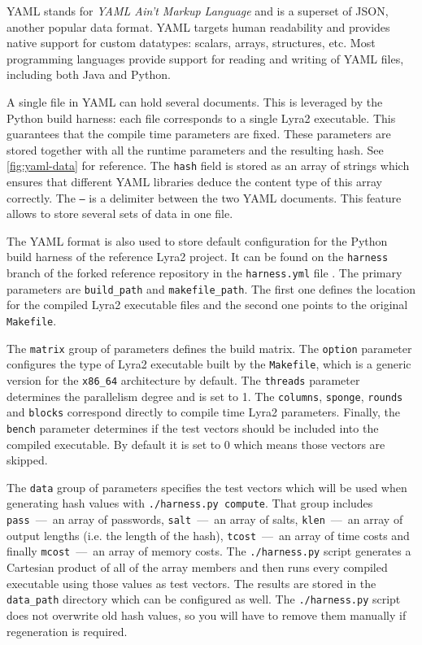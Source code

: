 YAML stands for \emph{YAML Ain't Markup Language} and is a superset of JSON, another popular data format. YAML targets human readability and provides native support for custom datatypes: scalars, arrays, structures, etc. Most programming languages provide support for reading and writing of YAML files, including both Java and Python.

A single file in YAML can hold several documents. This is leveraged by the Python build harness: each file corresponds to a single Lyra2 executable. This guarantees that the compile time parameters are fixed. These parameters are stored together with all the runtime parameters and the resulting hash. See \autoref{fig:yaml-data} for reference. The \texttt{hash} field is stored as an array of strings which ensures that different YAML libraries deduce the content type of this array correctly. The \texttt{---} is a delimiter between the two YAML documents. This feature allows to store several sets of data in one file.

The YAML format is also used to store default configuration for the Python build harness of the reference Lyra2 project. It can be found on the \texttt{harness} branch of the forked reference repository in the \texttt{harness.yml} file \cite{github:2017:lyra-copy}. The primary parameters are \texttt{build\_path} and \texttt{makefile\_path}. The first one defines the location for the compiled Lyra2 executable files and the second one points to the original \texttt{Makefile}.

The \texttt{matrix} group of parameters defines the build matrix. The \texttt{option} parameter configures the type of Lyra2 executable built by the \texttt{Makefile}, which is a generic version for the \texttt{x86\_64} architecture by default. The \texttt{threads} parameter determines the parallelism degree and is set to 1. The \texttt{columns}, \texttt{sponge}, \texttt{rounds} and \texttt{blocks} correspond directly to compile time Lyra2 parameters. Finally, the \texttt{bench} parameter determines if the test vectors should be included into the compiled executable. By default it is set to 0 which means those vectors are skipped.

The \texttt{data} group of parameters specifies the test vectors which will be used when generating hash values with \texttt{./harness.py compute}. That group includes \texttt{pass}~---~an array of passwords, \texttt{salt}~---~an array of salts, \texttt{klen}~---~an array of output lengths (i.e. the length of the hash), \texttt{tcost}~---~an array of time costs and finally \texttt{mcost}~---~an array of memory costs. The \texttt{./harness.py} script generates a Cartesian product of all of the array members and then runs every compiled executable using those values as test vectors. The results are stored in the \texttt{data\_path} directory which can be configured as well. The \texttt{./harness.py} script does not overwrite old hash values, so you will have to remove them manually if regeneration is required.

